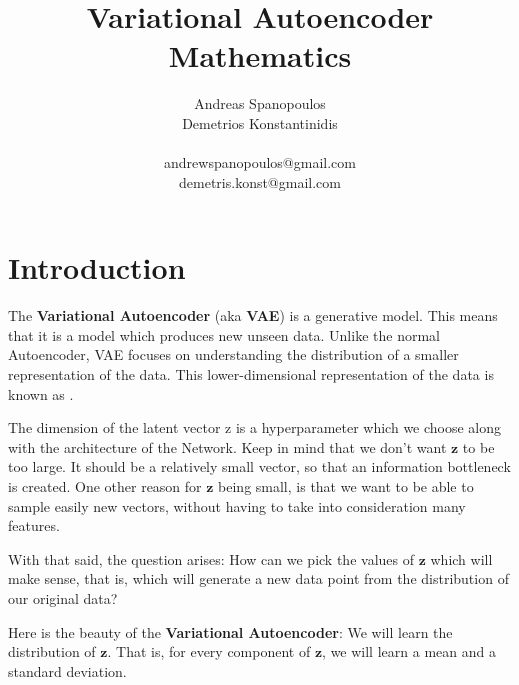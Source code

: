 \documentclass[12pt]{report}
\title{Variational Autoencoder Mathematics}
\author{\LARGE{Andreas Spanopoulos} \\
        \LARGE{Demetrios Konstantinidis} \\ \\
        andrewspanopoulos@gmail.com \\
        demetris.konst@gmail.com}
\begin{document}
\maketitle

\section*{Introduction}
\smallskip

The \textbf{Variational Autoencoder} (aka \textbf{VAE}) is a generative model.
This means that it is a model which produces new unseen data. Unlike the normal
Autoencoder, VAE focuses on understanding the distribution of a smaller
representation of the data. This lower-dimensional representation of the data is
known as .
\bigskip

The dimension of the latent vector z is a hyperparameter which we choose along
with the architecture of the Network. Keep in mind that we don't want
$\textbf{z}$ to be too large. It should be a relatively small vector, so that an
information bottleneck is created. One other reason for $\textbf{z}$ being small,
is that we want to be able to sample easily new vectors, without having to take
into consideration many features.
\bigskip

With that said, the question arises: How can we pick the values of $\textbf{z}$
which will make sense, that is, which will generate a new data point from the
distribution of our original data?
\bigskip

Here is the beauty of the \textbf{Variational Autoencoder}: We will learn the
distribution of $\textbf{z}$. That is, for every component of $\textbf{z}$, we
will learn a mean and a standard deviation.
\bigskip
\end{document}
